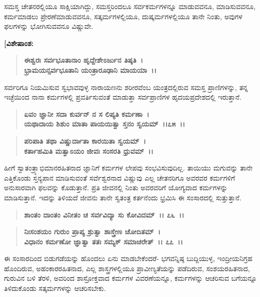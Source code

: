 ಸಮಸ್ತ ಚೇತನರಲ್ಲಿಯೂ ಸಾಕ್ಷಿಯಾಗಿದ್ದು, ಸಮಸ್ತರಿಂದಲೂ ಸರ್ವಕರ್ಮಗಳನ್ನೂ ಮಾಡುವವನೂ, ಮಾಡಿಸುವವನೂ, ಕರ್ಮಮಾಡಲು ಪ್ರೇರಣೆಮಾಡುವವನೂ, ಸತ್ಕರ್ಮಗಳಲ್ಲಿಯೂ, ದುಷ್ಕರ್ಮಗಳಲ್ಲಿಯೂ ತಾನೇ ನಿಂತು, ಅವುಗಳ ಫಲಗಳನ್ನು ಭೋಗಿಸುವವನೂ ವಿಷ್ಣುವೇ.

\begin{flushleft}
\textbf{[ವಿಶೇಷಾಂಶ:} 
\end{flushleft}

\begin{verse}
\textbf{ಈಶ್ವರಃ ಸರ್ವಭೂತಾನಾಂ ಹೃದ್ದೇಶೇಽರ್ಜುನ ತಿಷ್ಠತಿ~।}\\\textbf{ಭ್ರಾಮಯನ್ಸರ್ವಭೂತಾನಿ ಯಂತ್ರಾರೂಢಾನಿ ಮಾಯಯಾ~।।} 
\end{verse}

ಸರ್ವರಿಗೂ ನಿಯಮಿಸುವ ಸ್ವಭಾವವುಳ್ಳ ನಾರಾಯಣನು ಶರೀರವೆಂಬ ಯಂತ್ರದಲ್ಲಿರುವ ಸಮಸ್ತ ಪ್ರಾಣಿಗಳನ್ನು, ತನ್ನ ಇಚ್ಛೆಯಿಂದ ನಾನಾ ಕರ್ಮಗಳಲ್ಲಿ ಪ್ರವರ್ತಿಸುವಂತೆ ಮಾಡುತ್ತಾ ಸರ್ವಪ್ರಾಣಿಗಳ ಹೃದಯಪ್ರದೇಶದಲ್ಲಿ ಇರುತ್ತಾನೆ.

\begin{verse}
\textbf{ಏವಂ ಜ್ಞಾನೀ ಸದಾ ಕುರ್ವನ್ ನ ಸ ಲಿಪ್ಯತಿ ಕರ್ಮಣಾ~।}\\\textbf{ಯಥಾದಾಯ ಶಿಶುಂ ಮಾತಾ ಪಾಯಯಿತ್ವಾ ಸ್ತನಂ ಸ್ವಯಮ್~।।೭೫~।। }
\end{verse}

\begin{verse}
\textbf{ಪರಿಪಾತಿ ತಥಾ ವಿಷ್ಣುರ್ದಾತಾ ಕಾರಯಿತಾ ಸ್ವಯಮ್~।}\\\textbf{ಕರ್ತಾಹಮಿತಿ ಮತ್ವಾಽಯಂ ಜೀವಃ ಸಂಸರತಿ ಧ್ರುವಮ್~।।}
\end{verse}

ಹೀಗೆ ಸ್ವಾತಂತ್ರ್ಯಾಭಿಮಾನರಹಿತನಾದ ಜ್ಞಾನಿಗೆ ಕರ್ಮಗಳ ಲೇಪವು ಸಂಭವಿಸುವುದಿಲ್ಲ. ತಾಯಿಯು ಮಗುವನ್ನು ತಾನೇ ಎತ್ತಿಕೊಂಡು ಸ್ತನ್ಯಪಾನ ಮಾಡಿಸುವಂತೆ ಸರ್ವೆಶ್ವರನಾದ ವಿಷ್ಣುವು ಎಲ್ಲ ಚೇತನರಿಗೂ ಅವರವರ ಕರ್ಮಗಳಿಗೆ ಅನುಸಾರವಾಗಿ ಫಲವನ್ನು ಕೊಡುತ್ತಾನೆ. ಪ್ರತಿ ಜೀವನಲ್ಲಿ ನಿಂತು ಅವರವರಿಗೆ ಯೋಗ್ಯವಾದ ಕರ್ಮಗಳನ್ನು ಮಾಡಿಸುತ್ತಾನೆ. ಇದನ್ನು ತಿಳಿಯದೆ ಜೀವನು ತಾನೇ ಸ್ವತಂತ್ರ ಕರ್ತನೆಂದು ಭ್ರಮಿಸಿ ಈ ಸಂಸಾರದಲ್ಲಿ ಸುತ್ತುತ್ತಾನೆ.

\begin{verse}
\textbf{ಶಾಂತಂ ದಾಂತಂ ವಿನೀತಂ ಚ ಸರ್ವವಿದ್ಯಾ ಸು ಕೋವಿದಮ್~।। ೭೬~।।} 
\end{verse}

\begin{verse}
\textbf{ನಿಃಸಂಶಯಂ ಗುರುಂ ಪ್ರಾಪ್ಯ ಶ್ರುತ್ವಾ ಶಾಸ್ತ್ರೇಣ ಚೋದಿತಮ್~।}\\\textbf{ವಿಧಾನಂ ಕರ್ಮಣೋ ಜ್ಞಾತ್ವಾ ತತಃ ಸಮ್ಯಕ್ ಸಮಾಚರೇತ್~।। ೭೭~।।}
\end{verse}

ಈ ಸಂಸಾರದಿಂದ ಬಿಡುಗಡೆಯನ್ನು ಹೊಂದಲು ಏನು ಮಾಡಬೇಕೆಂದರೆ- ಭಗವನ್ನಿಷ್ಠ ಬುದ್ದಿಯುಳ್ಳ, ಇಂದ್ರೀಯನಿಗ್ರಹ ಹೊಂದಿರುವ, ಅಹಂಕಾರರಹಿತನಾದ, ಎಲ್ಲ ಶಾಸ್ತ್ರಗಳಲ್ಲಿಯೂ ಪ್ರಾವೀಣ್ಯತೆಯನ್ನು ಪಡೆದಿರುವ, ಸಂಶಯರಹಿತನಾದ, ಗುರುವಿನ ಬಳಿ ತೆರಳಿ, ಅವರಿಂದ ಶಾಸ್ರೋಕ್ತವಾದ ಕರ್ಮಗಳ ವಿವರಣೆಯನ್ನೂ, ಕರ್ಮಗಳನ್ನು ಆಚರಿಸುವ ಬಗೆಯನ್ನೂ ತಿಳಿದುಕೊಂಡು ಸತ್ಕರ್ಮಗಳನ್ನು ಆಚರಿಸಬೇಕು.

